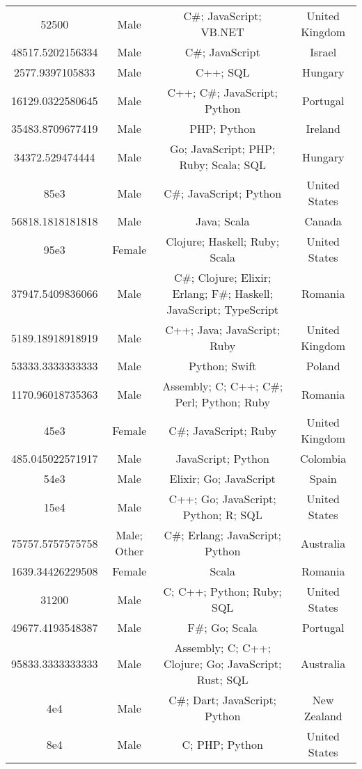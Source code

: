 \begin{center}
\begin{tabular}{ |c|c|c|c| }
52500  &  Male  &  C\#; JavaScript; VB.NET  &  United Kingdom  \\ 
48517.5202156334  &  Male  &  C\#; JavaScript  &  Israel  \\ 
2577.9397105833  &  Male  &  C++; SQL  &  Hungary  \\ 
16129.0322580645  &  Male  &  C++; C\#; JavaScript; Python  &  Portugal  \\ 
35483.8709677419  &  Male  &  PHP; Python  &  Ireland  \\ 
34372.529474444  &  Male  &  Go; JavaScript; PHP; Ruby; Scala; SQL  &  Hungary  \\ 
85e3  &  Male  &  C\#; JavaScript; Python  &  United States  \\ 
56818.1818181818  &  Male  &  Java; Scala  &  Canada  \\ 
95e3  &  Female  &  Clojure; Haskell; Ruby; Scala  &  United States  \\ 
37947.5409836066  &  Male  &  C\#; Clojure; Elixir; Erlang; F\#; Haskell; JavaScript; TypeScript  &  Romania  \\ 
5189.18918918919  &  Male  &  C++; Java; JavaScript; Ruby  &  United Kingdom  \\ 
53333.3333333333  &  Male  &  Python; Swift  &  Poland  \\ 
1170.96018735363  &  Male  &  Assembly; C; C++; C\#; Perl; Python; Ruby  &  Romania  \\ 
45e3  &  Female  &  C\#; JavaScript; Ruby  &  United Kingdom  \\ 
485.045022571917  &  Male  &  JavaScript; Python  &  Colombia  \\ 
54e3  &  Male  &  Elixir; Go; JavaScript  &  Spain  \\ 
15e4  &  Male  &  C++; Go; JavaScript; Python; R; SQL  &  United States  \\ 
75757.5757575758  &  Male; Other  &  C\#; Erlang; JavaScript; Python  &  Australia  \\ 
1639.34426229508  &  Female  &  Scala  &  Romania  \\ 
31200  &  Male  &  C; C++; Python; Ruby; SQL  &  United States  \\ 
49677.4193548387  &  Male  &  F\#; Go; Scala  &  Portugal  \\ 
95833.3333333333  &  Male  &  Assembly; C; C++; Clojure; Go; JavaScript; Rust; SQL  &  Australia  \\ 
4e4  &  Male  &  C\#; Dart; JavaScript; Python  &  New Zealand  \\ 
8e4  &  Male  &  C; PHP; Python  &  United States  \\ 

\end{tabular}
\end{center}
